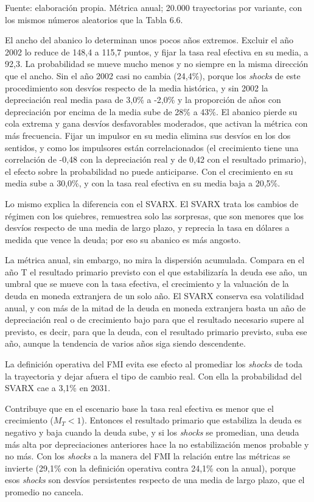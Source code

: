 Fuente: elaboración propia. Métrica anual; 20.000 trayectorias por
variante, con los mismos números aleatorios que la Tabla 6.6.

El ancho del abanico lo determinan unos pocos años extremos. Excluir el
año 2002 lo reduce de 148,4 a 115,7 puntos, y fijar la tasa real
efectiva en su media, a 92,3. La probabilidad se mueve mucho menos y no
siempre en la misma dirección que el ancho. Sin el año 2002 casi no
cambia (24,4\%), porque los \emph{shocks} de este procedimiento son
desvíos respecto de la media histórica, y sin 2002 la depreciación real
media pasa de 3,0\% a -2,0\% y la proporción de años con depreciación
por encima de la media sube de 28\% a 43\%. El abanico pierde su cola
extrema y gana desvíos desfavorables moderados, que activan la métrica
con más frecuencia. Fijar un impulsor en su media elimina sus desvíos en
los dos sentidos, y como los impulsores están correlacionados (el
crecimiento tiene una correlación de -0,48 con la depreciación real y de
0,42 con el resultado primario), el efecto sobre la probabilidad no
puede anticiparse. Con el crecimiento en su media sube a 30,0\%, y con
la tasa real efectiva en su media baja a 20,5\%.

Lo mismo explica la diferencia con el SVARX. El SVARX trata los cambios
de régimen con los quiebres, remuestrea solo las sorpresas, que son
menores que los desvíos respecto de una media de largo plazo, y reprecia
la tasa en dólares a medida que vence la deuda; por eso su abanico es
más angosto.

La métrica anual, sin embargo, no mira la dispersión acumulada. Compara
en el año T el resultado primario previsto con el que estabilizaría la
deuda ese año, un umbral que se mueve con la tasa efectiva, el
crecimiento y la valuación de la deuda en moneda extranjera de un solo
año. El SVARX conserva esa volatilidad anual, y con más de la mitad de
la deuda en moneda extranjera basta un año de depreciación real o de
crecimiento bajo para que el resultado necesario supere al previsto, es
decir, para que la deuda, con el resultado primario previsto, suba ese
año, aunque la tendencia de varios años siga siendo descendente.

La definición operativa del FMI evita ese efecto al promediar los
\emph{shocks} de toda la trayectoria y dejar afuera el tipo de cambio
real. Con ella la probabilidad del SVARX cae a 3,1\% en 2031.

Contribuye que en el escenario base la tasa real efectiva es menor que
el crecimiento (\(M_T < 1\)). Entonces el resultado primario que
estabiliza la deuda es negativo y baja cuando la deuda sube, y si los
\emph{shocks} se promedian, una deuda más alta por depreciaciones
anteriores hace la no estabilización menos probable y no más. Con los
\emph{shocks} a la manera del FMI la relación entre las métricas se
invierte (29,1\% con la definición operativa contra 24,1\% con la
anual), porque esos \emph{shocks} son desvíos persistentes respecto de
una media de largo plazo, que el promedio no cancela.

